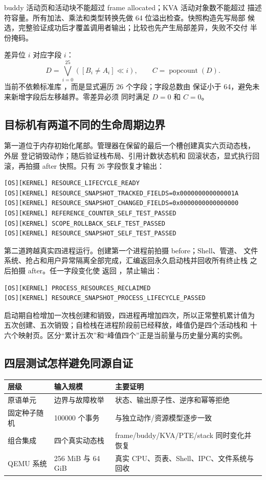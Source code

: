 buddy 活动页和活动块不能超过 frame allocated；KVA 活动对象数不能超过
描述符容量。所有加法、乘法和类型转换先做 64 位溢出检查。快照构造先写局部
候选，完整验证成功后才覆盖调用者输出；比较也先产生局部差异，失败不交付
半份掩码。

差异位 \(i\) 对应字段 \(i\)：
\[
  D=\bigvee_{i=0}^{25}
  \left([B_i\ne A_i]\ll i\right),\qquad
  C=\operatorname{popcount}(D).
\]
当前不依赖标准库 ，而是显式遍历 26 个字段；字段总数由
 保证小于 64，避免未来新增字段后左移越界。零差异必须
同时满足 \(D=0\) 和 \(C=0\)。

\subsection{目标机有两道不同的生命周期边界}

第一道位于内存初始化尾部。管理器在保留的最后一个槽创建真实六页动态栈，
外层  登记销毁动作；随后验证栈布局、引用计数状态机和
回滚状态，显式执行回滚，再拍摄 after 快照。只有 26 字段恢复才输出：

\begin{verbatim}
[OS][KERNEL] RESOURCE_LIFECYCLE_READY
[OS][KERNEL] RESOURCE_SNAPSHOT_TRACKED_FIELDS=0x000000000000001A
[OS][KERNEL] RESOURCE_SNAPSHOT_CHANGED_FIELDS=0x0000000000000000
[OS][KERNEL] REFERENCE_COUNTER_SELF_TEST_PASSED
[OS][KERNEL] SCOPE_ROLLBACK_SELF_TEST_PASSED
[OS][KERNEL] RESOURCE_SNAPSHOT_SELF_TEST_PASSED
\end{verbatim}

第二道跨越真实四进程运行。创建第一个进程前拍摄 before；Shell、管道、
文件系统、抢占和用户异常隔离全部完成，汇编返回永久启动栈并回收所有终止栈
之后拍摄 after。任一字段变化使  返回
，禁止输出：

\begin{verbatim}
[OS][KERNEL] PROCESS_RESOURCES_RECLAIMED
[OS][KERNEL] RESOURCE_SNAPSHOT_PROCESS_LIFECYCLE_PASSED
\end{verbatim}

启动期自检增加一次栈创建和销毁，四进程再增加四次，所以正常整机累计值为
五次创建、五次销毁；自检栈在进程阶段前已经释放，峰值仍是四个活动栈和
十六个映射页。区分“累计五次”和“峰值四个”正是当前量与历史量分离的实例。

\subsection{四层测试怎样避免同源自证}

\noindent\begin{tabularx}{\textwidth}{L{0.16\textwidth}L{0.18\textwidth}X}
\toprule
层级 & 输入规模 & 主要证明\\
\midrule
原语单元 & 边界与故障枚举 & 状态、输出原子性、逆序和幂等拒绝\\
固定种子随机 & 100000 个事务 & 与独立动作/资源模型逐步一致\\
组合集成 & 四个真实动态栈 & frame/buddy/KVA/PTE/stack 同时变化并恢复\\
QEMU 系统 & 256 MiB 与 64 GiB & 真实 CPU、页表、Shell、IPC、文件系统与回收\\
\bottomrule
\end{tabularx}


